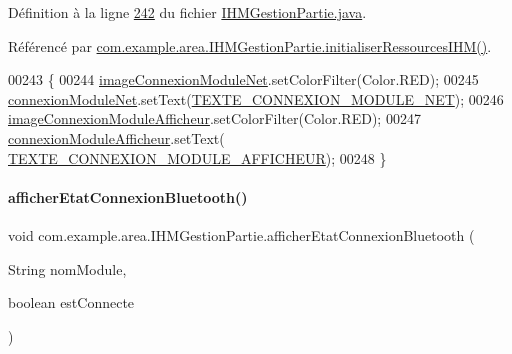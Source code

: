 Définition à la ligne \hyperlink{_i_h_m_gestion_partie_8java_source_l00242}{242} du fichier \hyperlink{_i_h_m_gestion_partie_8java_source}{I\+H\+M\+Gestion\+Partie.\+java}.



Référencé par \hyperlink{_i_h_m_gestion_partie_8java_source_l00223}{com.\+example.\+area.\+I\+H\+M\+Gestion\+Partie.\+initialiser\+Ressources\+I\+H\+M()}.


\begin{DoxyCode}
00243     \{
00244         \hyperlink{classcom_1_1example_1_1area_1_1_i_h_m_gestion_partie_a98c578b0056e17278e27aacefa933952}{imageConnexionModuleNet}.setColorFilter(Color.RED);
00245         \hyperlink{classcom_1_1example_1_1area_1_1_i_h_m_gestion_partie_a80163f148ea0264b5395a7c55ee5b4ed}{connexionModuleNet}.setText(\hyperlink{classcom_1_1example_1_1area_1_1_i_h_m_gestion_partie_a12cdd76d3c9dec83783e40a0d017ac17}{TEXTE\_CONNEXION\_MODULE\_NET});
00246         \hyperlink{classcom_1_1example_1_1area_1_1_i_h_m_gestion_partie_aae13761712b67eac1e69ac900c265ffc}{imageConnexionModuleAfficheur}.setColorFilter(Color.RED);
00247         \hyperlink{classcom_1_1example_1_1area_1_1_i_h_m_gestion_partie_a77e3d7f58799c309694b3ccbb3318150}{connexionModuleAfficheur}.setText(
      \hyperlink{classcom_1_1example_1_1area_1_1_i_h_m_gestion_partie_a60d4b79c44e29fe68c565cf24ed6a22a}{TEXTE\_CONNEXION\_MODULE\_AFFICHEUR});
00248     \}
\end{DoxyCode}
\mbox{\label{classcom_1_1example_1_1area_1_1_i_h_m_gestion_partie_a73fa6d212cf9c5e4dc8fadc96d8d35e9}} 
\paragraph{\texorpdfstring{afficher\+Etat\+Connexion\+Bluetooth()}{afficherEtatConnexionBluetooth()}}
{\footnotesize\ttfamily void com.\+example.\+area.\+I\+H\+M\+Gestion\+Partie.\+afficher\+Etat\+Connexion\+Bluetooth (\begin{DoxyParamCaption}\item[{String}]{nom\+Module,  }\item[{boolean}]{est\+Connecte }\end{DoxyParamCaption})\hspace{0.3cm}{\ttfamily [private]}}




